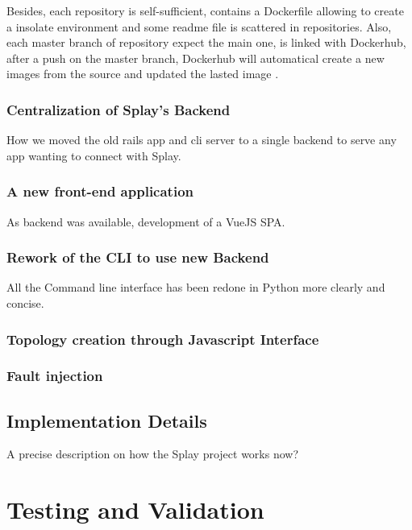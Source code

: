 \documentclass{eplmastersthesis}
\begin{document}
        Besides, each repository is self-sufficient, contains a Dockerfile allowing to create a
        insolate environment and some readme file is scattered in repositories.
        Also, each master branch of repository expect the main one, is linked with
        Dockerhub, after a push on the master branch, Dockerhub will automatical create a new images from
        the source and updated the lasted image \cite{DockerHubGithub}.

      \subsection{Centralization of Splay's Backend}

        How we moved the old rails app and cli server to a single backend
        to serve any app wanting to connect with Splay.

      \subsection{A new front-end application}

        As backend was available, development of a VueJS SPA.

      \subsection{Rework of the CLI to use new Backend}

        All the Command line interface has been redone in Python more clearly and concise.

      \subsection{Topology creation through Javascript Interface}

      \subsection{Fault injection}

    \section{Implementation Details}

      A precise description on how the Splay project works now?


  \chapter{Testing and Validation}
\end{document}
